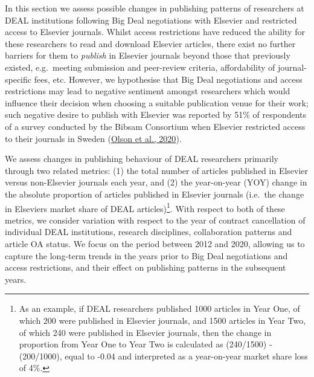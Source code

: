 \documentclass[
]{article}
\begin{document}
In this section we assess possible changes in publishing patterns of researchers at DEAL institutions following Big Deal negotiations with Elsevier and restricted access to Elsevier journals. Whilst access restrictions have reduced the ability for these researchers to read and download Elsevier articles, there exist no further barriers for them to \emph{publish} in Elsevier journals beyond those that previously existed, e.g.~meeting submission and peer-review criteria, affordability of journal-specific fees, etc. However, we hypothesise that Big Deal negotiations and access restrictions may lead to negative sentiment amongst researchers which would influence their decision when choosing a suitable publication venue for their work; such negative desire to publish with Elsevier was reported by 51\% of respondents of a survey conducted by the Bibsam Consortium when Elsevier restricted access to their journals in Sweden (\href{http://doi.org/10.1629/uksg.507}{Olson et al., 2020}).

We assess changes in publishing behaviour of DEAL researchers primarily through two related metrics: (1) the total number of articles published in Elsevier versus non-Elsevier journals each year, and (2) the year-on-year (YOY) change in the absolute proportion of articles published in Elsevier journals (i.e.~the change in Elsevier\textquotesingle s market share of DEAL articles)\footnote{As an example, if DEAL researchers published 1000 articles in Year One, of which 200 were published in Elsevier journals, and 1500 articles in Year Two, of which 240 were published in Elsevier journals, then the change in proportion from Year One to Year Two is calculated as (240/1500) - (200/1000), equal to -0.04 and interpreted as a year-on-year market share loss of 4\%.}. With respect to both of these metrics, we consider variation with respect to the year of contract cancellation of individual DEAL institutions, research disciplines, collaboration patterns and article OA status. We focus on the period between 2012 and 2020, allowing us to capture the long-term trends in the years prior to Big Deal negotiations and access restrictions, and their effect on publishing patterns in the subsequent years.
\end{document}
